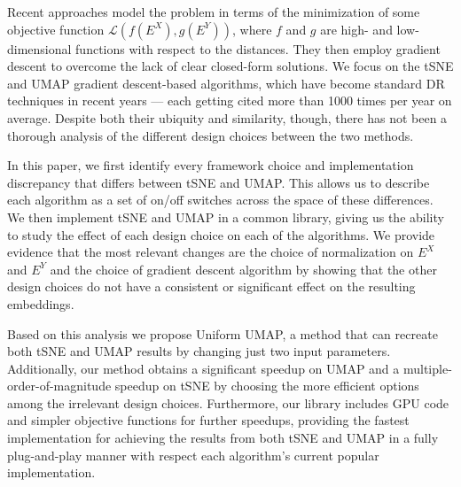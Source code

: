 \documentclass[sigconf, nonacm]{acmart}
\begin{document}
Recent approaches model the problem in terms of the minimization of some objective function $\mathcal{L}(f(E^X), g(E^Y))$, where $f$ and $g$ are high- and
low-dimensional functions with respect to the distances. They then employ gradient descent to overcome the lack of clear closed-form solutions. We
focus on the tSNE \cite{van2008visualizing} and UMAP \cite{mcinnes2018umap} gradient descent-based algorithms, which have become standard DR
techniques in recent years --- each getting cited more than
1000 times per year on average. Despite both their ubiquity and similarity, though, there has not been a thorough analysis of the different design choices
     between the two methods.

In this paper, we first identify every framework choice and implementation discrepancy that differs between tSNE and UMAP. This allows us to describe each algorithm as a set of on/off
switches across the space of these differences. We then implement tSNE and UMAP in a common library, giving us the ability to study the effect of each
design choice on each of the algorithms.
We provide evidence that the most relevant changes are the choice of normalization on $E^X$ and $E^Y$ and the choice of gradient descent algorithm by showing that the other design choices do not have a consistent or significant effect on the resulting embeddings.

Based on this analysis we propose Uniform UMAP, a method that can recreate both tSNE and UMAP results by changing just two input parameters. Additionally, our
method obtains a significant speedup on UMAP and a multiple-order-of-magnitude speedup on tSNE by choosing the more efficient options among the
irrelevant design choices.
Furthermore, our library includes GPU code and simpler objective functions for further speedups, providing the fastest implementation for achieving the results
from both tSNE and UMAP in
a fully plug-and-play manner with respect each algorithm's current popular implementation.
\end{document}
